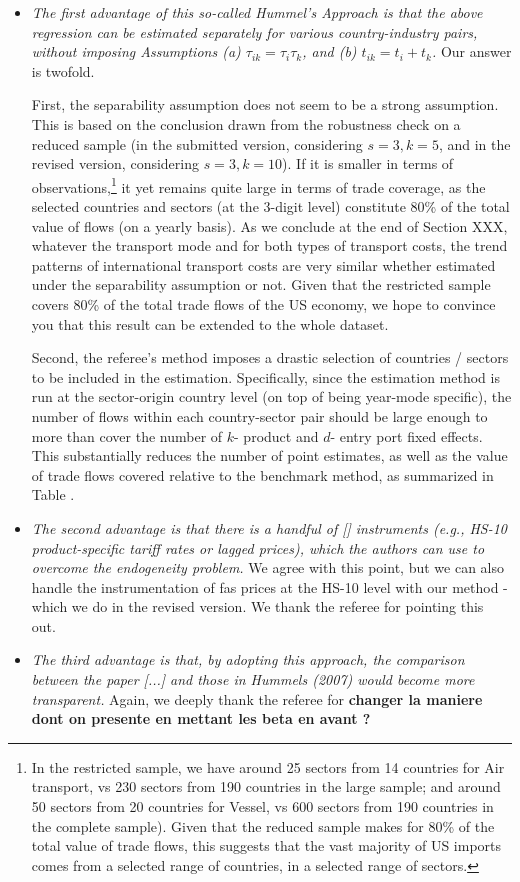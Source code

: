 \documentclass[a4paper,12pt]{article}
\begin{document}
\begin{itemize}
\item \textit{The first advantage of this so-called Hummel's Approach is that the above
regression can be estimated separately for various country-industry pairs, without
imposing Assumptions (a) $\tau_{ik} = \tau_i\tau_{k}$, and (b) $t_{ik} = t_i+ t_{k}$.} Our answer is twofold. 

First, the separability assumption does not seem to be a strong assumption. This is based on the conclusion drawn from the robustness check on a reduced sample (in the submitted version, considering $s=3, k=5$, and in the revised version, considering $s=3, k=10$). If it is smaller in terms of observations,\footnote{In the restricted sample, we have around 25 sectors from 14 countries for Air transport, vs 230 sectors from 190 countries in the large sample; and around 50 sectors from 20 countries for Vessel, vs 600 sectors from 190 countries in the complete sample). Given that the reduced sample makes for 80\% of the total value of trade flows, this suggests that the vast majority of US imports comes from a selected range of countries, in a selected range of sectors.} it yet remains quite large in terms of trade coverage, as the selected countries and sectors (at the 3-digit level) constitute 80\% of the total value of flows (on a yearly basis). As we conclude at the end of Section XXX, whatever the transport mode and for both types of transport costs, the trend patterns of international transport costs are very similar whether estimated under the separability assumption or not. Given that the restricted sample covers 80\% of the total trade flows of the US economy, we hope to convince you that this result can be extended to the whole dataset.


Second, the referee's method imposes a drastic selection of countries / sectors to be included in the estimation. Specifically, since the estimation method is run at the sector-origin country level (on top of being year-mode specific), the number of flows within each country-sector pair should be large enough to more than cover the number of $k$- product and $d$- entry port fixed effects. This substantially reduces the number of point estimates, as well as the value of trade flows covered relative to the  benchmark method, as summarized in Table . 



\item \textit{The second advantage is that there is a handful of [] instruments (e.g., HS-10 product-specific tariff rates or lagged prices), which the authors can use to overcome the endogeneity problem.}  We agree with this point, but we can also handle the instrumentation of fas prices at the HS-10 level with our method - which we do in the revised version. We thank the referee for pointing this out.


\item \textit{The third advantage is that, by adopting this approach, the comparison between the paper [...] and those in Hummels (2007) would become more transparent.} Again, we deeply thank the referee for  \textbf{changer la maniere dont on presente en mettant les beta en avant ?}
\end{itemize}
\end{document}
